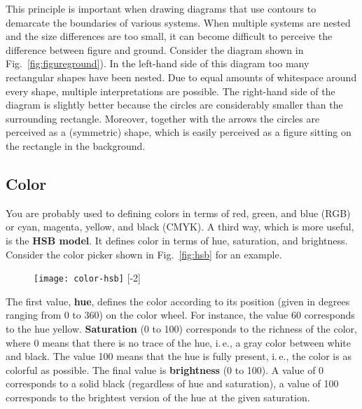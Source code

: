 This principle is important when drawing diagrams that use contours to demarcate the boundaries of various systems. When multiple systems are nested and the size differences are too small, it can become difficult to perceive the difference between figure and ground. Consider the diagram shown in Fig.~\ref{fig:figureground}). In the left-hand side of this diagram too many rectangular shapes have been nested. Due to equal amounts of whitespace around every shape, multiple interpretations are possible. The right-hand side of the diagram is slightly better because the circles are considerably smaller than the surrounding rectangle. Moreover, together with the arrows the circles are perceived as a (symmetric) shape, which is easily perceived as a figure sitting on the rectangle in the background.




\subsection{Color}

You are probably used to defining colors in terms of red, green, and blue (RGB) or cyan, magenta, yellow, and black (CMYK). A third way, which is more useful, is the \textbf{HSB model}. It defines color in terms of hue, saturation, and brightness. Consider the color picker shown in Fig.~\ref{fig:hsb} for an example.

\begin{figure}
\centering
\texttt{[image: color-hsb]}
[-2\baselineskip]
\end{figure}

The first value, \textbf{hue}, defines the color according to its position (given in degrees ranging from 0 to 360) on the color wheel. For instance, the value 60 corresponds to the hue yellow. \textbf{Saturation} (0 to 100) corresponds to the richness of the color, where 0 means that there is no trace of the hue, i.\,e., a gray color between white and black. The value 100 means that the hue is fully present, i.\,e., the color is as colorful as possible. The final value is \textbf{brightness} (0 to 100). A value of 0 corresponds to a solid black (regardless of hue and saturation), a value of 100 corresponds to the brightest version of the hue at the given saturation.

